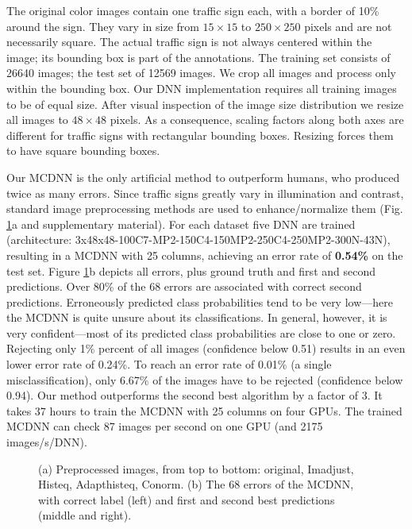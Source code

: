 \documentclass[a4paper]{article}
\begin{document}
The original color images contain one traffic sign each, 
with a border of 10\% around the sign. They vary in size
from $15\times15$ to $250\times250$ pixels and are not necessarily
square. The actual traffic sign is not always centered within the
image; its bounding box is part of the
annotations. The training set consists of 26640 images; the test
set of 12569 images. We crop all images and 
process only within the bounding box. Our DNN implementation requires all
training images to be of equal size. After visual
inspection of the image size distribution  we
resize all images to $48\times48$ pixels. As a consequence, scaling
factors along both axes are different for traffic signs with
rectangular bounding boxes. Resizing forces them to have square
bounding boxes.

Our MCDNN is the only artificial method to outperform humans, who produced twice as many errors. Since traffic signs greatly vary in illumination and contrast, standard image preprocessing methods are used  to enhance/normalize them (Fig. \ref{fig:GTSRB}a and supplementary material). For each dataset five DNN are trained (architecture: 3x48x48-100C7-MP2-150C4-150MP2-250C4-250MP2-300N-43N), resulting in a MCDNN with 25 columns, achieving an error rate of {\bf 0.54\%} on the test set. Figure \ref{fig:GTSRB}b depicts all errors, plus ground truth and first and second predictions. Over 80\% of the 68 errors are associated with correct second predictions. Erroneously predicted class probabilities tend to be very low---here the MCDNN is quite unsure about its classifications. In general, however,  it is very confident---most of its predicted class probabilities are close to one or zero. Rejecting only 1\% percent of all images (confidence below 0.51) results in an even lower error rate of 0.24\%. To reach an error rate of 0.01\% (a single misclassification), only 6.67\% of the images have to be rejected (confidence below 0.94). Our method outperforms the second best algorithm by a factor of 3.  It takes 37 hours to train the MCDNN with 25 columns on four GPUs. The trained MCDNN can check 87 images per second on one GPU (and 2175 images/s/DNN).

\begin{figure}[h]
	\centering
	\setlength{\fboxsep}{5pt}
	\setlength{\fboxrule}{0pt}
	\caption{(a) Preprocessed images, from top to bottom: original, Imadjust, Histeq, Adapthisteq, Conorm. (b) The 68 errors of the MCDNN, with correct label (left) and first and second best predictions (middle and right).}

\label{fig:GTSRB}
\end{figure}
\end{document}
